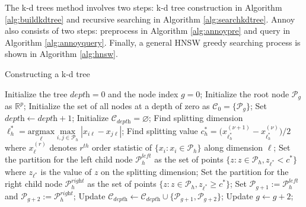 \documentclass[11pt,a4paper,]{article}
\begin{document}
The k-d trees method involves two steps: k-d tree construction in Algorithm \ref{alg:buildkdtree} and recursive searching in Algorithm \ref{alg:searchkdtree}.
Annoy also consists of two steps: preprocess in Algorithm \ref{alg:annoypre} and query in Algorithm \ref{alg:annoyquery}.
Finally, a general HNSW greedy searching process is shown in Algorithm \ref{alg:hnsw}.

\begin{algorithm}[!htb]
  \caption{Constructing a k-d tree}
  \label{alg:buildkdtree}
  \begin{algorithmic}[1]
    \STATE Initialize the tree $\textit{depth}=0$ and the node index $g=0$;
    \STATE Initialize the root node $\mathcal{P}_g$ as $\mathbb{R}^p$;
    \STATE Initialize the set of all nodes at a depth of zero as $\mathcal{C}_0=\{\mathcal{P}_g\}$;
      \STATE Set $\textit{depth}\leftarrow \textit{depth}+1$;
      \STATE Initialize $\mathcal{C}_{\textit{depth}}=\varnothing$;
        \STATE Find splitting dimension $\ell_h^*=\underset{\ell}{\textrm{argmax}}\underset{i,j\in\mathcal{P}_h}{\max}|x_{i\ell}-x_{j\ell}|$;
        \STATE Find splitting value $c_h^*=\big(x^{(\nu+1)}_{{\ell_h^*}}-x^{(\nu)}_{{\ell_h^*}}\big)/2$ where $x^{(r)}_{\ell}$ denotes $r^{th}$ order statistic of $\{x_i:x_{i}\in\mathcal{P}_h\}$ along dimension $\ell$;
        \STATE Set the partition for the left child node $\mathcal{P}^{\textit{left}}_h$ as the set of points $\{z:z\in\mathcal{P}_h, z_{\ell^*}<c^*\}$ where $z_{\ell^*}$ is the value of $z$ on the splitting dimension;
        \STATE Set the partition for the right child node $\mathcal{P}^{\textit{right}}_h$ as the set of points $\{z:z\in\mathcal{P}_h, z_{\ell^*}\geq c^*\}$;
        \STATE Set $\mathcal{P}_{g+1}:=\mathcal{P}_h^{\textit{left}}$ and $\mathcal{P}_{g+2}:=\mathcal{P}_h^{\textit{right}}$;
        \STATE Update $\mathcal{C}_{\textit{depth}}\leftarrow\mathcal{C}_{\textit{depth}}\cup\{\mathcal{P}_{g+1},\mathcal{P}_{g+2}\}$;
        \STATE Update $g\leftarrow g+2$;
      \ENDFOR
    \ENDWHILE
  \end{algorithmic}
\end{algorithm}
\end{document}
